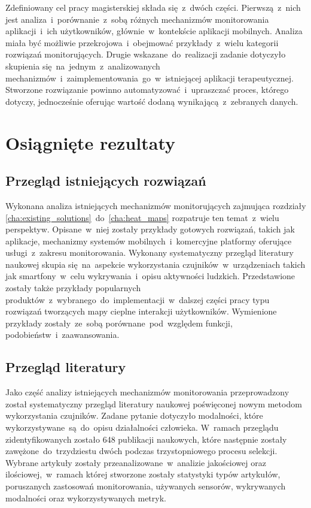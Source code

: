 Zdefiniowany cel pracy magisterskiej składa się~z~dwóch części. Pierwszą~z~nich jest analiza~i~porównanie~z~sobą różnych mechanizmów monitorowania aplikacji~i~ich użytkowników, głównie~w~kontekście aplikacji mobilnych. Analiza miała być możliwie przekrojowa~i~obejmować przykłady~z~wielu kategorii rozwiązań monitorujących. Drugie wskazane~do~realizacji zadanie dotyczyło skupienia się~na~jednym~z~analizowanych mechanizmów~i~zaimplementowania~go~w~istniejącej aplikacji terapeutycznej. Stworzone rozwiązanie powinno automatyzować~i~upraszczać proces, którego dotyczy, jednocześnie oferując wartość dodaną wynikającą~z~zebranych danych.
	
\section{Osiągnięte rezultaty}

\subsection{Przegląd istniejących rozwiązań}
Wykonana analiza istniejących mechanizmów monitorujących zajmująca rozdziały \ref{cha:existing_solutions}~do~\ref{cha:heat_maps} rozpatruje ten temat~z~wielu perspektyw. Opisane~w~niej zostały przykłady gotowych rozwiązań, takich jak aplikacje, mechanizmy systemów mobilnych~i~komercyjne platformy oferujące usługi~z~zakresu monitorowania. Wykonany systematyczny przegląd literatury naukowej skupia się~na~aspekcie wykorzystania czujników~w~urządzeniach takich jak smartfony~w~celu wykrywania~i~opisu aktywności ludzkich. Przedstawione zostały także przykłady popularnych produktów~z~wybranego~do~implementacji~w~dalszej części pracy typu rozwiązań tworzących mapy cieplne interakcji użytkowników. Wymienione przykłady zostały~ze~sobą porównane~pod~względem funkcji, podobieństw~i~zaawansowania.

\subsection{Przegląd literatury}
Jako część analizy istniejących mechanizmów monitorowania przeprowadzony został systematyczny przegląd literatury naukowej poświęconej nowym metodom wykorzystania czujników. Zadane pytanie dotyczyło modalności, które wykorzystywane~są~do~opisu działalności człowieka. W~ramach przeglądu zidentyfikowanych zostało 648 publikacji naukowych, które następnie zostały zawężone~do~trzydziestu dwóch podczas trzystopniowego procesu selekcji. Wybrane artykuły zostały przeanalizowane~w~analizie jakościowej oraz ilościowej,~w~ramach której stworzone zostały statystyki typów artykułów, poruszanych zastosowań monitorowania, używanych sensorów, wykrywanych modalności oraz wykorzystywanych metryk.

